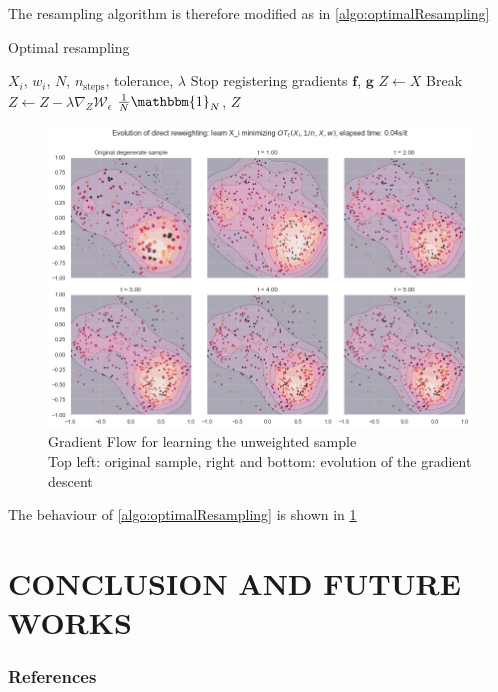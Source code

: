 \documentclass[]{article}
\begin{document}
		The resampling algorithm is therefore modified as in \cref{algo:optimalResampling}
		
		\begin{algorithm}
			\caption{Optimal resampling}
			\label{algo:optimalResampling}
			\begin{algorithmic}
				 $X_i$, $w_i$, $N$, $n_{\text{steps}}$, tolerance, $\lambda$ 
				\STATE Stop registering gradients
				 $\mathbf{f}$, $\mathbf{g}$
				\STATE $Z \leftarrow X$
						\STATE Break
					\ENDIF
					\STATE $Z \leftarrow Z - \lambda \nabla_Z \mathcal{W}_\epsilon$
				\ENDFOR
				\OUTPUT $\frac 1 N \mathbbm{1}_N$, $Z$
			\end{algorithmic}
		\end{algorithm}
		
		\begin{figure}
			\centering
			\captionsetup{justification=centering}
			\includegraphics[width=\textwidth]{LearntReweighting}
			\caption{Gradient Flow for learning the unweighted sample\\
				Top left: original sample, right and bottom: evolution of the gradient descent}
			\label{fig:LearntReweighting}
		\end{figure}	

		
		The behaviour of \cref{algo:optimalResampling} is shown in \cref{fig:LearntReweighting}
	


\section{CONCLUSION AND FUTURE WORKS}
\label{sec:conclusion}



\subsubsection*{References}

\printbibliography[heading=none]
\end{document}
